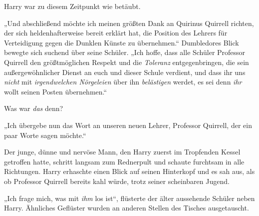Harry war zu diesem Zeitpunkt wie betäubt.

„Und abschließend möchte ich meinen größten Dank an Quirinus Quirrell richten, der sich heldenhafterweise bereit erklärt hat, die Position des Lehrers für Verteidigung gegen die Dunklen Künste zu übernehmen.“ Dumbledores Blick bewegte sich suchend über seine Schüler. „Ich hoffe, dass alle Schüler Professor Quirrell den größtmöglichen Respekt und die \emph{Toleranz} entgegenbringen, die sein außergewöhnlicher Dienst an euch und dieser Schule verdient, und dass ihr uns \emph{nicht} mit \emph{irgendwelchen Nörgeleien} über ihn \emph{belästigen} werdet, es sei denn \emph{ihr} wollt seinen Posten übernehmen.“

Was war \emph{das} denn?

„Ich übergebe nun das Wort an unseren neuen Lehrer, Professor Quirrell, der ein paar Worte sagen möchte.“

Der junge, dünne und nervöse Mann, den Harry zuerst im Tropfenden Kessel getroffen hatte, schritt langsam zum Rednerpult und schaute furchtsam in alle Richtungen. Harry erhaschte einen Blick auf seinen Hinterkopf und es sah aus, als ob Professor Quirrell bereits kahl würde, trotz seiner scheinbaren Jugend.

„Ich frage mich, was mit \emph{ihm} los ist“, flüsterte der älter aussehende Schüler neben Harry. Ähnliches Geflüster wurden an anderen Stellen des Tisches ausgetauscht.

